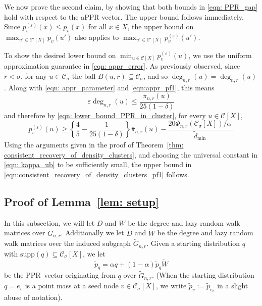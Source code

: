 \documentclass[11pt,twoside]{article}
\newcommand{\1}{\mathbbm{1}}
\newcommand{\pbf}{p}        %
\newcommand{\Xbf}{X}
\newcommand{\Wbf}{W}
\newcommand{\Dbf}{D}
\newcommand{\Cset}{\mathcal{C}}
\newcommand{\Csig}{\Cset_{\sigma}}
\newcommand{\degminwt}{\widetilde{d}_{\min}}
\newcommand{\pprspace}{{\sc PPR~}}
\begin{document}
We now prove the second claim, by showing that both bounds in \eqref{eqn: PPR_gap} hold with respect to the aPPR vector. The upper bound follows immediately. Since $p^{(\varepsilon)}_v(x) \leq p_v(x)$ for all $x \in \Xbf$, the upper bound on $\max_{u' \in \Cset'[\Xbf]} p_v(u')$ also applies to $\max_{u' \in \Cset'[\Xbf]} p^{(\varepsilon)}_v(u')$. 

To show the desired lower bound on $\min_{u \in \Cset[\Xbf]} p^{(\varepsilon)}_v(u)$, we use the uniform approximation guarantee in \eqref{eqn: appr_error}. As previously observed, since $r < \sigma$, for any $u \in \Csig$ the ball $B(u,r) \subseteq \Csig$, and so $\widetilde{\deg}_{n,r}(u) = \deg_{n,r}(u)$. Along with \eqref{eqn: appr_parameter} and \eqref{eqn:appr_pf1}, this means
\begin{equation*}
\varepsilon \deg_{n,r}(u) \leq \frac{\overline{\pi}_{n,r}(u)}{25(1 - \delta)}
\end{equation*}
and therefore by \eqref{eqn: lower_bound_PPR_in_cluster}, for every $u \in \Cset[\Xbf]$,
\begin{equation*}
p^{(\varepsilon)}_v(u) \geq \left\{\frac{4}{5} - \frac{1}{25(1 - \delta)}\right\} \overline{\pi}_{n,r}(u) - \frac{20 \Phi_{n,r}(\Csig[\Xbf])/\alpha}{\degminwt}.
\end{equation*}
\noindent Using the arguments given in the proof of Theorem~\ref{thm: consistent_recovery_of_density_clusters}, and choosing the universal constant in \eqref{eqn: kappa_ub} to be sufficiently small, the upper bound in \eqref{eqn:consistent_recovery_of_density_clusters_pf1} follows.

\subsection{Proof of Lemma~\ref{lem: setup}}

In this subsection, we will let $\Dbf$ and $\Wbf$ be the degree and lazy random walk matrices over $G_{n,r}$. Additionally we let $\widetilde{\Dbf}$ and $\widetilde{\Wbf}$ be the degree and lazy random walk matrices over the induced subgraph $\widetilde{G}_{n,r}$. Given a starting distribution $q$ with $\mathrm{supp}(q) \subseteq \Csig[\Xbf]$, we let
	\begin{equation}
	\widetilde{\pbf}_q = \alpha q + (1 - \alpha) \widetilde{\pbf}_{q} \widetilde{\Wbf}
	\end{equation}
	be the \pprspace vector originating from $q$ over $\widetilde{G}_{n,r}$. (When the starting distribution $q = e_v$ is a point mass at a seed node $v \in \Csig[\Xbf]$, we write $\widetilde{\pbf}_v := \widetilde{\pbf}_{e_v}$ in a slight abuse of notation).
	
\end{document}
